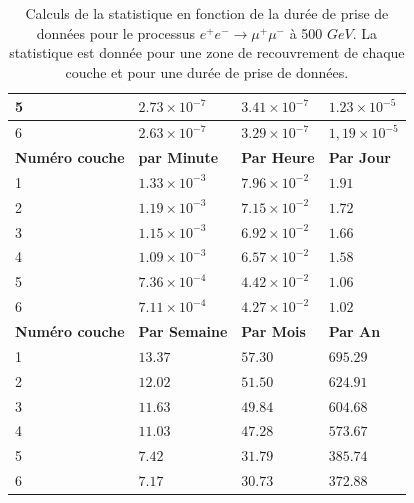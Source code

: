 \begin{table}[!hb]
\begin{tabular}{|l|l|l|l|}
5                        & $2.73 \times 10^{-7}$          & $3.41 \times 10^{-7}$                & $1.23 \times 10^{-5}$ \\ \hline
6                        & $2.63 \times 10^{-7}$          & $3.29 \times 10^{-7}$                & $1,19 \times 10^{-5}$ \\ \hline
\textbf{Num\'ero couche}   & \textbf{par Minute}            & \textbf{Par Heure}                   & \textbf{Par Jour}     \\ \hline
1                        & $1.33 \times 10^{-3}$                   & $7.96 \times 10^{-2}$                        & $1.91$          \\ \hline
2                        & $1.19 \times 10^{-3}$                   & $7.15 \times 10^{-2}$                        & $1.72$          \\ \hline
3                        & $1.15 \times 10^{-3}$                   & $6.92 \times 10^{-2}$                        & $1.66$          \\ \hline
4                        & $1.09 \times 10^{-3}$                   & $6.57 \times 10^{-2}$                        & $1.58$          \\ \hline
5                        & $7.36 \times 10^{-4}$                   & $4.42 \times 10^{-2}$                        & $1.06$          \\ \hline
6                        & $7.11 \times 10^{-4}$                   & $4.27 \times 10^{-2}$                        & $1.02$          \\ \hline
\textbf{Num\'ero couche}   & \textbf{Par Semaine}           & \textbf{Par Mois}                    & \textbf{Par An}       \\ \hline
1                        & $13.37$                  & $57.30$                        & $695.29$        \\ \hline
2                        & $12.02$                  & $51.50$                        & $624.91$        \\ \hline
3                        & $11.63$                  & $49.84$                        & $604.68$        \\ \hline
4                        & $11.03$                  & $47.28$                        & $573.67$        \\ \hline
5                        & $7.42$                   & $31.79$                        & $385.74$        \\ \hline
6                        & $7.17$                   & $30.73$                        & $372.88$        \\ \hline
\end{tabular}
  \caption{Calculs de la statistique en fonction de la dur\'ee de prise de donn\'ees pour le processus $e^+ e^- \rightarrow \mu^+ \mu^-$ \`a 500 $GeV$. La statistique est donn\'ee pour une zone de recouvrement de chaque couche et pour une dur\'ee de prise de donn\'ees.}
  \label{tab:statMuMu}
  \end{table}
  
